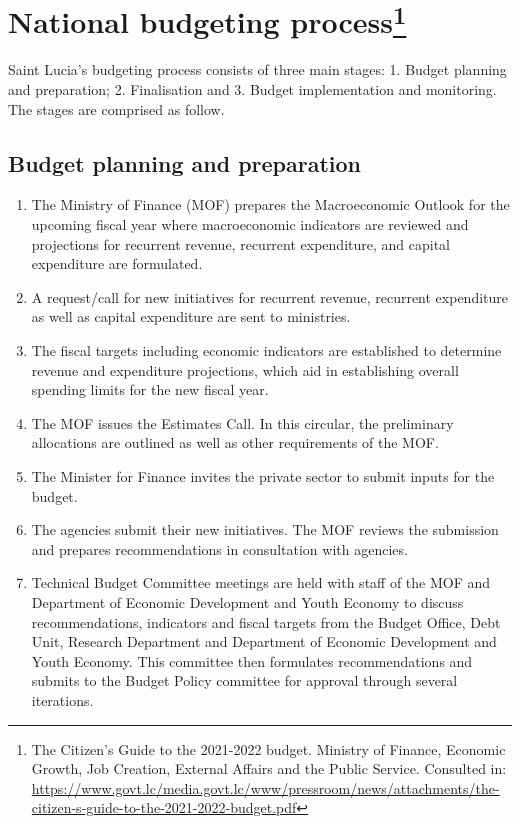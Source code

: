 \documentclass[
  10pt,
]{book}
\begin{document}
\hypertarget{national-budgeting-process-1}{%
\section[National budgeting process]{\texorpdfstring{National budgeting process\footnote{The Citizen's Guide to the 2021-2022 budget. Ministry of Finance, Economic Growth, Job Creation, External Affairs and the Public Service. Consulted in: \url{https://www.govt.lc/media.govt.lc/www/pressroom/news/attachments/the-citizen-s-guide-to-the-2021-2022-budget.pdf}}}{National budgeting process}}\label{national-budgeting-process-1}}

Saint Lucia's budgeting process consists of three main stages: 1. Budget planning and preparation; 2. Finalisation and 3. Budget implementation and monitoring. The stages are comprised as follow.

\hypertarget{budget-planning-and-preparation-1}{%
\subsection{Budget planning and preparation}\label{budget-planning-and-preparation-1}}

\begin{enumerate}
\def\labelenumi{\arabic{enumi}.}
\item
  The Ministry of Finance (MOF) prepares the Macroeconomic Outlook for the upcoming fiscal year where macroeconomic indicators are reviewed and projections for recurrent revenue, recurrent expenditure, and capital expenditure are formulated.
\item
  A request/call for new initiatives for recurrent revenue, recurrent expenditure as well as capital expenditure are sent to ministries.
\item
  The fiscal targets including economic indicators are established to determine revenue and expenditure projections, which aid in establishing overall spending limits for the new fiscal year.
\item
  The MOF issues the Estimates Call. In this circular, the preliminary allocations are outlined as well as other requirements of the MOF.
\item
  The Minister for Finance invites the private sector to submit inputs for the budget.
\item
  The agencies submit their new initiatives. The MOF reviews the submission and prepares recommendations in consultation with agencies.
\item
  Technical Budget Committee meetings are held with staff of the MOF and Department of Economic Development and Youth Economy to discuss recommendations, indicators and fiscal targets from the Budget Office, Debt Unit, Research Department and Department of Economic Development and Youth Economy. This committee then formulates recommendations and submits to the Budget Policy committee for approval through several iterations.
\end{enumerate}
\end{document}
